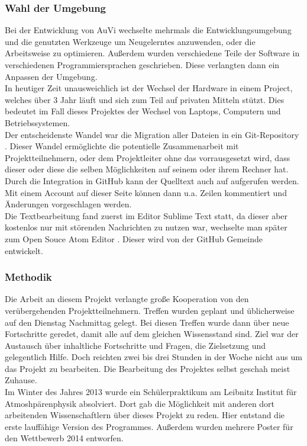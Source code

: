 \subsubsection{Wahl der Umgebung}\label{sec:ent} %
Bei der Entwicklung von AuVi wechselte mehrmals die Entwicklungsumgebung und die
genutzten Werkzeuge um Neugelerntes anzuwenden, oder die Arbeitsweise zu optimieren.
Außerdem wurden verschiedene Teile der Software in verschiedenen Programmiersprachen
geschrieben. Diese verlangten dann ein Anpassen der Umgebung.\\
In heutiger Zeit unausweichlich ist der Wechsel der Hardware in einem Project,
welches über 3 Jahr läuft und sich zum Teil auf privaten Mitteln stützt. Dies
bedeutet im Fall dieses Projektes der Wechsel von Laptops,
Computern und Betriebssystemen.\\
Der entscheidenste Wandel war die Migration aller Dateien in ein Git-Repository \cite{gitrepo}.
Dieser Wandel ermöglichte die potentielle Zusammenarbeit mit Projektteilnehmern, oder
dem Projektleiter ohne das vorrausgesetzt wird, dass dieser oder diese die selben Möglichkeiten
auf seinem oder ihrem Rechner hat. Durch die Integration in GitHub kann der Quelltext auch auf
 aufgerufen werden. Mit einem Account auf dieser
Seite können dann u.a. Zeilen kommentiert und Änderungen vorgeschlagen werden. \\
Die Textbearbeitung fand zuerst im Editor Sublime Text \cite{sublime} statt, da dieser
aber kostenlos nur mit störenden Nachrichten zu nutzen war, wechselte man später
zum Open Souce Atom Editor \cite{atomio}. Dieser wird von der GitHub Gemeinde entwickelt.

\subsubsection{Methodik} %
Die Arbeit an diesem Projekt verlangte große Kooperation
von den verübergehenden Projektteilnehmern.
Treffen wurden geplant und üblicherweise auf den Dienstag Nachmittag gelegt.
Bei diesen Treffen wurde dann über neue Fortschritte geredet,
damit alle auf dem gleichen Wissensstand sind.
Ziel war der Austausch über inhaltliche Fortschritte und Fragen, die Zielsetzung und
gelegentlich Hilfe.
Doch reichten zwei bis drei Stunden in der Woche nicht aus um das Projekt zu bearbeiten.
Die Bearbeitung des Projektes selbst geschah meist Zuhause.\\
Im Winter des Jahres 2013 wurde ein Schülerpraktikum am
Leibnitz Institut für Atmoshpärenphysik absolviert.
Dort gab die Möglichkeit mit anderen dort arbeitenden
Wissenschaftlern über dieses Projekt zu reden.
Hier entstand die erste lauffähige Version des Programmes.
Außerdem wurden mehrere Poster für den \jf Wettbewerb 2014 entworfen.

